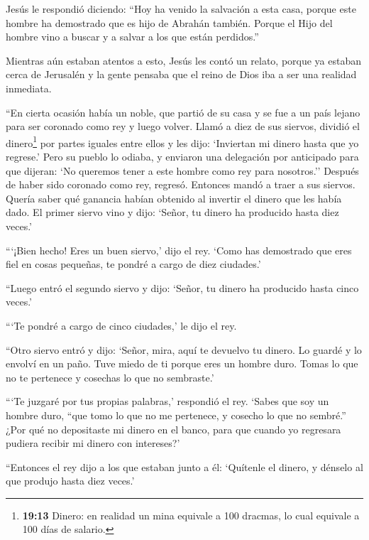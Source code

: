  Jesús le respondió diciendo: ``Hoy ha venido la salvación a
esta casa, porque este hombre ha demostrado que es hijo de Abrahán
también.  Porque el Hijo del hombre vino a buscar y a
salvar a los que están perdidos.''

 Mientras aún estaban atentos a esto, Jesús les contó un
relato, porque ya estaban cerca de Jerusalén y la gente pensaba que el
reino de Dios iba a ser una realidad inmediata.

 ``En cierta ocasión había un noble, que partió de su casa
y se fue a un país lejano para ser coronado como rey y luego volver.
 Llamó a diez de sus siervos, dividió el dinero\footnote{\textbf{19:13}
  Dinero: en realidad un mina equivale a 100 dracmas, lo cual equivale a
  100 días de salario.} por partes iguales entre ellos y les dijo:
`Inviertan mi dinero hasta que yo regrese.'  Pero su pueblo
lo odiaba, y enviaron una delegación por anticipado para que dijeran:
`No queremos tener a este hombre como rey para nosotros.'' 
Después de haber sido coronado como rey, regresó. Entonces mandó a traer
a sus siervos. Quería saber qué ganancia habían obtenido al invertir el
dinero que les había dado.  El primer siervo vino y dijo:
`Señor, tu dinero ha producido hasta diez veces.'

 ```¡Bien hecho! Eres un buen siervo,' dijo el rey. `Como
has demostrado que eres fiel en cosas pequeñas, te pondré a cargo de
diez ciudades.'

 ``Luego entró el segundo siervo y dijo: `Señor, tu dinero
ha producido hasta cinco veces.'

 ```Te pondré a cargo de cinco ciudades,' le dijo el rey.

 ``Otro siervo entró y dijo: `Señor, mira, aquí te devuelvo
tu dinero. Lo guardé y lo envolví en un paño.  Tuve miedo
de ti porque eres un hombre duro. Tomas lo que no te pertenece y
cosechas lo que no sembraste.'

 ```Te juzgaré por tus propias palabras,' respondió el rey.
`Sabes que soy un hombre duro, ``que tomo lo que no me pertenece, y
cosecho lo que no sembré.''  ¿Por qué no depositaste mi
dinero en el banco, para que cuando yo regresara pudiera recibir mi
dinero con intereses?'

 ``Entonces el rey dijo a los que estaban junto a él:
`Quítenle el dinero, y dénselo al que produjo hasta diez veces.'

